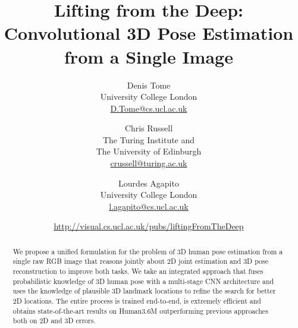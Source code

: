 \documentclass[10pt,twocolumn,letterpaper]{article}
\begin{document}
\graphicspath{{Images/}}
\newcommand{\comment}[2]{#2}
\title{Lifting from the Deep: Convolutional 3D Pose
Estimation from a Single Image} 

\author{Denis Tome               \\
University College London                       \\
\href{mailto:D.Tome@cs.ucl.ac.uk}{D.Tome@cs.ucl.ac.uk}
\and
Chris Russell                      \\
 The Turing Institute and\\
The University of Edinburgh\\
\href{mailto:crussell@turing.ac.uk}{crussell@turing.ac.uk}
\and
Lourdes Agapito\\
University College London                       \\
\href{mailto:l.agapito@cs.ucl.ac.uk}{l.agapito@cs.ucl.ac.uk}
\and
\url{http://visual.cs.ucl.ac.uk/pubs/liftingFromTheDeep}%
}

\maketitle
\thispagestyle{empty}

\begin{abstract}
  We propose a unified formulation for the problem of 3D human pose
  estimation from a single raw RGB image that reasons jointly about 2D
  joint estimation and 3D pose reconstruction to improve both tasks.
  We take an integrated approach that fuses probabilistic knowledge of
  3D human pose with a multi-stage CNN architecture and uses the
  knowledge of plausible 3D landmark locations to refine the search
  for better 2D locations. The entire process is trained end-to-end,
  is extremely efficient and obtains state-of-the-art results on
  Human3.6M outperforming previous approaches both on 2D and 3D
  errors.
  \vspace{-5mm}
\end{abstract}
\end{document}
